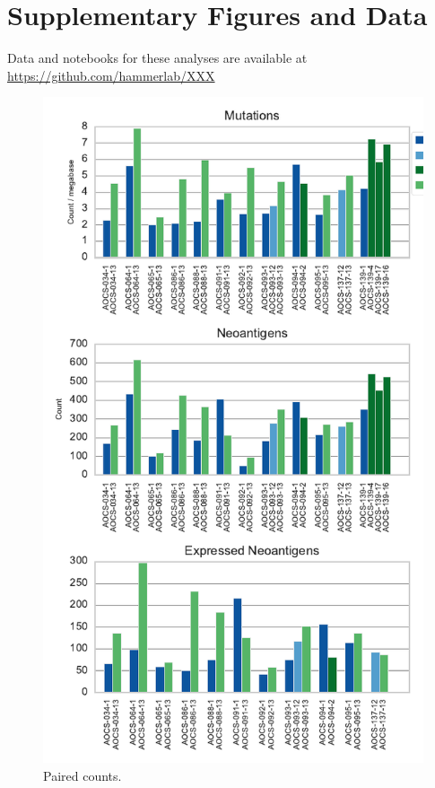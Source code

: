 \section*{Supplementary Figures and Data}

Data and notebooks for these analyses are available at \url{https://github.com/hammerlab/XXX}

\begin{figure}
\centering
\includegraphics[scale=1.0]{figures/paired_counts.pdf}
\caption{Paired counts. }
\label{fig:supp_paired}
\end{figure}

